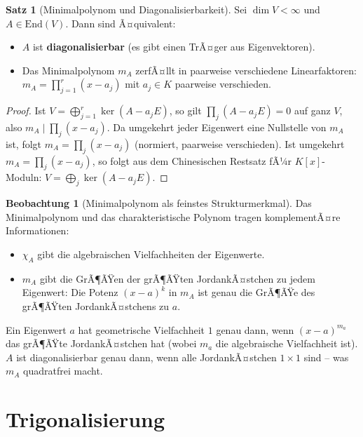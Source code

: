 ﻿\documentclass[a4paper,12pt]{report}
\theoremstyle{definition}
\newtheorem{satz}{Satz}
\newtheorem{beobachtung}{Beobachtung}
\begin{document}
\begin{satz}[Minimalpolynom und Diagonalisierbarkeit]
    Sei $\dim V < \infty$ und $A \in \mathrm{End}(V)$. Dann sind Ã¤quivalent:
    \begin{itemize}
        \item[-] $A$ ist \textbf{diagonalisierbar} (es gibt einen TrÃ¤ger aus Eigenvektoren).
        \item[-] Das Minimalpolynom $m_A$ zerfÃ¤llt in paarweise verschiedene
              Linearfaktoren: $m_A = \prod_{j=1}^r (x - a_j)$ mit $a_j \in K$ paarweise verschieden.
    \end{itemize}
\end{satz}
\begin{proof}
    Ist $V = \bigoplus_{j=1}^r \ker(A - a_j E)$, so gilt $\prod_j (A - a_j E) = 0$
    auf ganz $V$, also $m_A \mid \prod_j (x - a_j)$. Da umgekehrt jeder Eigenwert
    eine Nullstelle von $m_A$ ist, folgt $m_A = \prod_j (x - a_j)$ (normiert,
    paarweise verschieden). Ist umgekehrt $m_A = \prod_j (x - a_j)$, so folgt
    aus dem Chinesischen Restsatz fÃ¼r $K[x]$-Moduln:
    $V = \bigoplus_j \ker(A - a_j E)$.
\end{proof}

\begin{beobachtung}[Minimalpolynom als feinstes Strukturmerkmal]
    Das Minimalpolynom und das charakteristische Polynom tragen
    komplementÃ¤re Informationen:
    \begin{itemize}
        \item[-] $\chi_A$ gibt die algebraischen Vielfachheiten der Eigenwerte.
        \item[-] $m_A$ gibt die GrÃ¶ÃŸen der grÃ¶ÃŸten JordankÃ¤stchen zu jedem Eigenwert:
              Die Potenz $(x - a)^k$ in $m_A$ ist genau die GrÃ¶ÃŸe des grÃ¶ÃŸten
              JordankÃ¤stchens zu $a$.
    \end{itemize}
    Ein Eigenwert $a$ hat geometrische Vielfachheit $1$ genau dann, wenn
    $(x-a)^{m_a}$ das grÃ¶ÃŸte JordankÃ¤stchen hat (wobei $m_a$ die algebraische
    Vielfachheit ist). $A$ ist diagonalisierbar genau dann, wenn alle
    JordankÃ¤stchen $1 \times 1$ sind -- was $m_A$ quadratfrei macht.
\end{beobachtung}

\section{Trigonalisierung}
\end{document}
